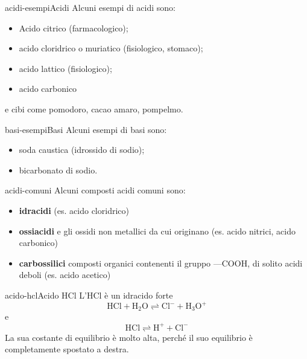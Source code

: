 \documentclass[preview]{standalone}
\begin{document}
\genpage

\begin{snippetexample}{acidi-esempi}{Acidi}
    Alcuni esempi di acidi sono:
    \begin{itemize}
        \item Acido citrico (farmacologico);
        \item acido cloridrico o muriatico (fisiologico, stomaco);
        \item acido lattico (fisiologico);
        \item acido carbonico
    \end{itemize}
    e cibi come pomodoro, cacao amaro, pompelmo.
\end{snippetexample}

\begin{snippetexample}{basi-esempi}{Basi}
    Alcuni esempi di basi sono:
    \begin{itemize}
        \item soda caustica (idrossido di sodio);
        \item bicarbonato di sodio.
    \end{itemize}
\end{snippetexample}


\begin{snippet}{acidi-comuni}
    Alcuni composti acidi comuni sono:
    \begin{itemize}
        \item \textbf{idracidi} (es. acido cloridrico)
        \item \textbf{ossiacidi} e gli ossidi non metallici da cui originano (es. acido nitrici, acido carbonico)
        \item \textbf{carbossilici} composti organici contenenti il gruppo —COOH,
            di solito acidi deboli (es. acido acetico)
    \end{itemize}
\end{snippet}

\begin{snippetexample}{acido-hcl}{Acido HCl}
    L'HCl è un idracido forte
    \[
        \text{HCl} + \text{H}_2\text{O} \rightleftharpoons \text{Cl}^- + \text{H}_3\text{O}^+
    \]
    e
    \[
        \text{HCl} \rightleftharpoons \text{H}^+ + \text{Cl}^-
    \]
    La sua costante di equilibrio è molto alta, perché il suo equilibrio è completamente spostato a destra.
\end{snippetexample}
\end{document}
